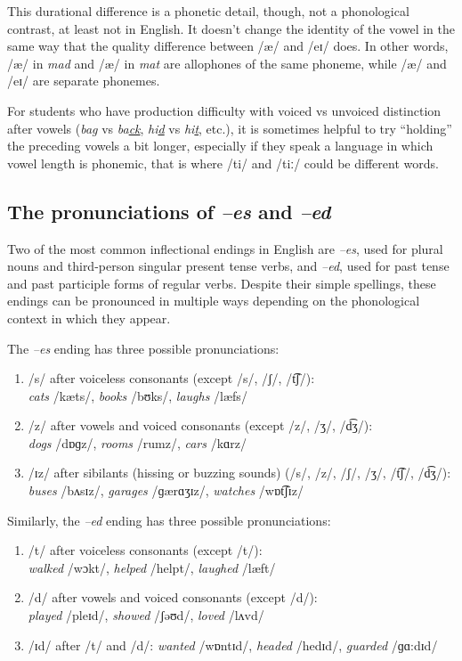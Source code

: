 This durational difference is a phonetic detail, though, not a phonological contrast, at least not in English. It doesn't change the identity of the vowel in the same way that the quality difference between /æ/ and /eɪ/ does. In other words, /æ/ in \textit{mad} and /æ/ in \textit{mat} are allophones of the same phoneme, while /æ/ and /eɪ/ are separate phonemes.

For students who have production difficulty with voiced vs unvoiced distinction after vowels (\textit{ba\uline{g}} vs \textit{ba\uline{ck}}, \textit{hi\uline{d}} vs \textit{hi\uline{t}}, etc.), it is sometimes helpful to try ``holding'' the preceding vowels a bit longer, especially if they speak a language in which vowel length is phonemic, that is where /ti/ and /tiː/ could be different words.

\subsection{The pronunciations of \textit{--\op e\cp s} and \textit{--ed}}

Two of the most common inflectional endings in English are \textit{--\op e\cp s}, used for plural nouns and third-person singular present tense verbs, and \textit{--ed}, used for past tense and past participle forms of regular verbs. Despite their simple spellings, these endings can be pronounced in multiple ways depending on the phonological context in which they appear.

The \textit{--\op e\cp s} ending has three possible pronunciations:

\begin{enumerate}[noitemsep]
    \item /s/ after voiceless consonants (except /s/, /ʃ/, /t͡ʃ/): \\\textit{cats} /kæts/, \textit{books} /bʊks/, \textit{laughs} /læfs/
    \item /z/ after vowels and voiced consonants (except /z/, /ʒ/, /d͡ʒ/): \\\textit{dogs} /dɒɡz/, \textit{rooms} /rumz/, \textit{cars} /kɑrz/
    \item /ɪz/ after sibilants (hissing or buzzing sounds) (/s/, /z/, /ʃ/, /ʒ/, /t͡ʃ/, /d͡ʒ/): \textit{buses} /bʌsɪz/, \textit{garages} /ɡærɑʒɪz/, \textit{watches} /wɒt͡ʃɪz/
\end{enumerate}

Similarly, the \textit{--ed} ending has three possible pronunciations:

\begin{enumerate}[noitemsep]
    \item /t/ after voiceless consonants (except /t/): \\\textit{walked} /wɔkt/, \textit{helped} /helpt/, \textit{laughed} /læft/
    \item /d/ after vowels and voiced consonants (except /d/): \\\textit{played} /pleɪd/, \textit{showed} /ʃəʊd/, \textit{loved} /lʌvd/
    \item /ɪd/ after /t/ and /d/: \textit{wanted} /wɒntɪd/, \textit{headed} /hedɪd/, \textit{guarded} /ɡɑ:dɪd/
\end{enumerate}

